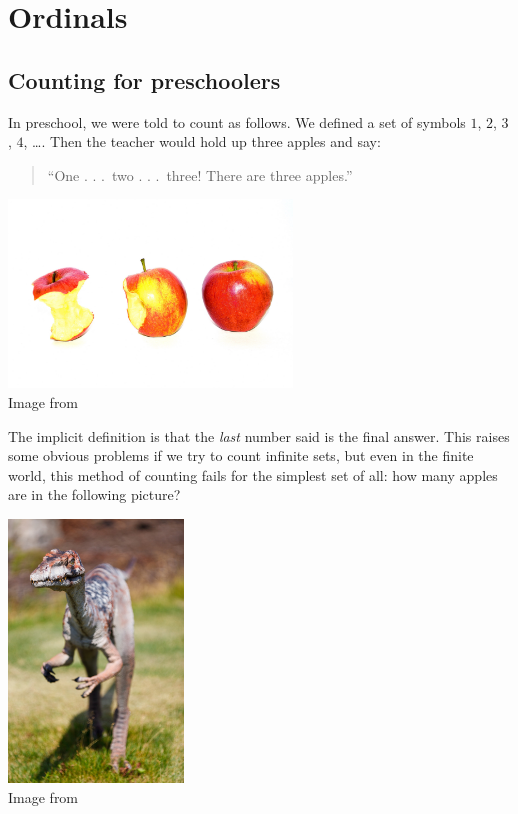 \chapter{Ordinals}
\label{ch:ordinal}
\section{Counting for preschoolers}
In preschool, we were told to count as follows.
We defined a set of symbols $1$, $2$, $3$, $4$, \dots.
Then the teacher would hold up three apples and say:
\begin{quote}
	``One . . .\ two . . .\ three!  There are three apples.''
\end{quote}

\begin{center}
	\includegraphics[height=5cm]{media/three-apples.jpg}
	\\ \scriptsize Image from \cite{img:apples}
\end{center}

The implicit definition is that the \emph{last} number said is the final answer.
This raises some obvious problems if we try to count infinite sets,
but even in the finite world,
this method of counting fails for the simplest set of all:
how many apples are in the following picture?

\begin{center}
	\includegraphics[height=7cm]{media/velociraptor.jpg}
	\\ \scriptsize Image from \cite{img:velociraptor}
\end{center}

